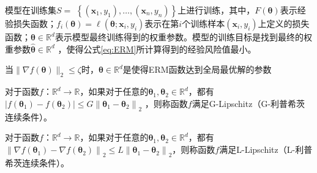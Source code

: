 模型在训练集$S=$ $\left\{\left(\mathbf{x}_{1}, y_{1}\right), \ldots,\left(\mathbf{x}_{n}, y_{n}\right)\right\}$上进行训练，其中，$F(\boldsymbol{\theta})$表示经验损失函数；$f_{i}(\boldsymbol{\theta})=\ell\left(\boldsymbol{\theta} ; \mathbf{x}_{i}, y_{i}\right)$表示在第$i$个训练样本$\left(\mathbf{x}_{i}, y_{i}\right)$上定义的损失函数；$\boldsymbol{\theta} \in \mathbb{R}^{d}$表示模型最终训练得到的权重参数。模型的训练目标是找到最终的权重参数$\widehat{\boldsymbol{\theta}} \in \mathbb{R}^{d}$ ，使得公式\ref{eq:ERM}所计算得到的经验风险值最小。

\begin{define}\label{全局最优点}
当$\|\nabla f(\boldsymbol{\theta})\|_{2} \leq \zeta$时，$\boldsymbol{\theta} \in \mathbb{R}^{d}$是使得ERM函数达到全局最优解的参数
\end{define}

\begin{define}\label{G-Lipschitz}
对于函数$f$：$\mathbb{R}^{d} \rightarrow \mathbb{R}$，如果对于任意的$\boldsymbol{\theta}_{1}, \boldsymbol{\theta}_{2} \in \mathbb{R}^{d}$，都有$\left|f\left(\boldsymbol{\theta}_{1}\right)-f\left(\boldsymbol{\theta}_{2}\right)\right| \leq G\left\|\boldsymbol{\theta}_{1}-\boldsymbol{\theta}_{2}\right\|_{2}$
，则称函数$f$满足G-Lipschitz（G-利普希茨连续条件）。
\end{define}

\begin{define}\label{L-Lipschitz}
对于函数$f$：$\mathbb{R}^{d} \rightarrow \mathbb{R}$，如果对于任意的$\boldsymbol{\theta}_{1}, \boldsymbol{\theta}_{2} \in \mathbb{R}^{d}$，都有\\$\left\|\nabla f\left(\boldsymbol{\theta}_{1}\right)-\nabla f\left(\boldsymbol{\theta}_{2}\right)\right\|_{2} \leq L\left\|\boldsymbol{\theta}_{1}-\boldsymbol{\theta}_{2}\right\|_{2}$，则称函数$f$满足L-Lipschitz（L-利普希茨连续条件）。
\end{define}

